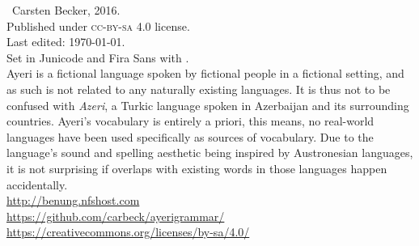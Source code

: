 
\begin{minipage}[b][\textheight][b]{0.67\textwidth}\small
\ccbysa~Carsten Becker, 2016.\\
Published under \textsc{cc-by-sa} 4.0 license.\\
Last edited: \today{}.\\[.5\baselineskip]

Set in Junicode and {\sffamily Fira Sans} with \XeTeX{}.\\[.5\baselineskip]

Ayeri is a fictional language spoken by fictional people in a fictional setting, and as such is not related to any naturally existing languages. It is thus not to be confused with \emph{Azeri}, a Turkic language spoken in Azerbaijan and its surrounding countries. Ayeri’s vocabulary is entirely a priori, this means, no real-world languages have been used specifically as sources of vocabulary. Due to the language’s sound and spelling aesthetic being inspired by Austronesian languages, it is not surprising if overlaps with existing words in those languages happen accidentally.\\[.5\baselineskip]

\href{http://benung.nfshost.com}{http://benung.nfshost.com}\\
\href{https://github.com/carbeck/ayerigrammar}{https://github.com/carbeck/ayerigrammar/}\\
\href{https://creativecommons.org/licenses/by-sa/4.0/}{https://creativecommons.org/licenses/by-sa/4.0/}\\%

\end{minipage}
